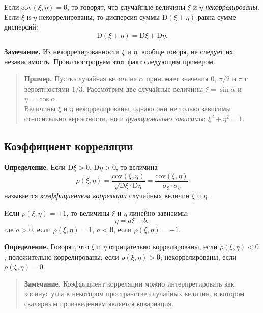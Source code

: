 \documentclass[11pt,a4paper]{article}
\begin{document}
Если \(\mathrm{cov}\left( \xi, \eta \right) = 0\), то говорят, что
случайные величины \(\xi\) и \(\eta\) \emph{некоррелированы}.\\
Если \(\xi\) и \(\eta\) некоррелированы, то дисперсия суммы
\(\mathrm{D}(\xi+\eta)\) равна сумме дисперсий:
\[ \mathrm{D}(\xi+\eta) = \mathrm{D}\xi + \mathrm{D}\eta. \]

\textbf{Замечание.} Из некоррелированности \(\xi\) и \(\eta\), вообще
говоря, не следует их независимость. Проиллюстрируем этот факт следующим
примером.

\begin{quote}
\textbf{Пример.} Пусть случайная величина \(\alpha\) принимает значения
0, \(\pi/2\) и \(\pi\) с вероятностями 1/3. Рассмотрим две случайные
величины \(\xi = \sin \alpha\) и \(\eta = \cos \alpha\).\\
Величины \(\xi\) и \(\eta\) некоррелированы, однако они не только
зависимы относительно вероятности, но и \emph{функционально зависимы}:
\(\xi^2 + \eta^2 = 1\).
\end{quote}

    \hypertarget{ux43aux43eux44dux444ux444ux438ux446ux438ux435ux43dux442-ux43aux43eux440ux440ux435ux43bux44fux446ux438ux438}{%
\subsection{Коэффициент
корреляции}\label{ux43aux43eux44dux444ux444ux438ux446ux438ux435ux43dux442-ux43aux43eux440ux440ux435ux43bux44fux446ux438ux438}}

\textbf{Определение.} Если \(\mathrm{D}\xi > 0\),
\(\mathrm{D}\eta > 0\), то величина \[
    \rho(\xi, \eta) = \dfrac{\mathrm{cov}(\xi, \eta)}{\sqrt{\mathrm{D}\xi \cdot \mathrm{D}\eta}} = \dfrac{\mathrm{cov}(\xi, \eta)}{\sigma_\xi \cdot \sigma_\eta}
\] называется \emph{коэффициентом корреляции} случайных величин \(\xi\)
и \(\eta\).

Eсли \(\rho(\xi, \eta) = \pm 1\), то величины \(\xi\) и \(\eta\) линейно
зависимы: \[ \eta =a \xi + b, \] где \(a>0\), если
\(\rho(\xi, \eta) = 1\), \(a<0\), если \(\rho(\xi, \eta) = -1\).

\textbf{Определение.} Говорят, что \(\xi\) и \(\eta\) отрицательно
коррелированы, если \(\rho(\xi, \eta) < 0\); положительно коррелированы,
если \(\rho(\xi, \eta) > 0\); некоррелированы, если
\(\rho(\xi, \eta) = 0\).

\begin{quote}
\textbf{Замечание.} Коэффициент корреляции можно интерпретировать как
косинус угла в некотором пространстве случайных величин, в котором
скалярным произведением является ковариация.
\end{quote}
\end{document}
